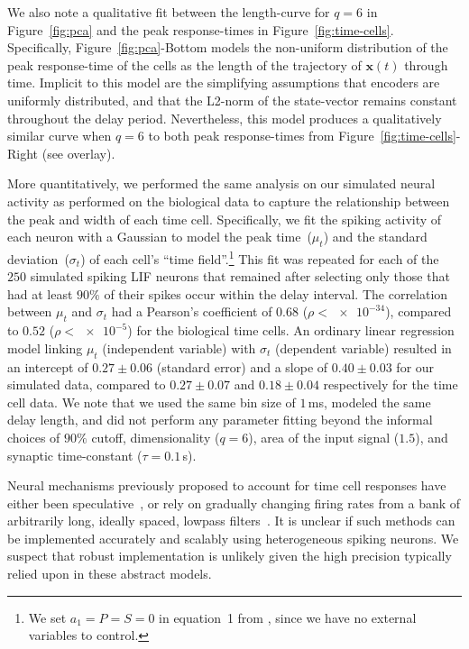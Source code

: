 \documentclass[12pt]{article}
\theoremstyle{definition}
\renewcommand{\vec}{\mathbf}  %
\begin{document}
We also note a qualitative fit between the length-curve for $q=6$ in Figure~\ref{fig:pca} and the peak response-times in Figure~\ref{fig:time-cells}.
Specifically, Figure~\ref{fig:pca}-Bottom models the non-uniform distribution of the peak response-time of the cells as the length of the trajectory of $\vec{x}(t)$ through time.
Implicit to this model are the simplifying assumptions that encoders are uniformly distributed, and that the L2-norm of the state-vector remains constant throughout the delay period.
Nevertheless, this model produces a qualitatively similar curve when $q = 6$ to both peak response-times from Figure~\ref{fig:time-cells}-Right (see overlay).

More quantitatively, we performed the same analysis on our simulated neural activity as \citet{tiganj2016sequential} performed on the biological data to capture the relationship between the peak and width of each time cell.
Specifically, we fit the spiking activity of each neuron with a Gaussian to model the peak time~($\mu_t$) and the standard deviation~($\sigma_t$) of each cell's ``time field''.\footnote{
We set $a_1 = P = S = 0$ in equation~1 from \citet{tiganj2016sequential}, since we have no external variables to control.
}
This fit was repeated for each of the $250$ simulated spiking LIF neurons that remained after selecting only those that had at least $90\%$ of their spikes occur within the delay interval.
The correlation between $\mu_t$ and $\sigma_t$ had a Pearson's coefficient of $0.68$ ($\rho < \num{e-34}$), compared to $0.52$ ($\rho < \num{e-5}$) for the biological time cells.
An ordinary linear regression model linking $\mu_t$ (independent variable) with $\sigma_t$ (dependent variable) resulted in an intercept of $0.27 \pm 0.06$ (standard error) and a slope of $0.40 \pm 0.03$ for our simulated data, compared to $0.27 \pm 0.07$ and $0.18 \pm 0.04$ respectively for the time cell data.
We note that we used the same bin size of $1$\,ms, modeled the same delay length, and did not perform any parameter fitting beyond the informal choices of $90\%$ cutoff, dimensionality ($q=6$), area of the input signal ($1.5$), and synaptic time-constant ($\tau = 0.1$\,s).

Neural mechanisms previously proposed to account for time cell responses have either been speculative~\citep{tiganj2016sequential},
or rely on gradually changing firing rates from a bank of arbitrarily long, ideally spaced, lowpass filters~\citep{shankar2012scale, howard2014unified, tiganj2015simple, tiganj2017neural}.
It is unclear if such methods can be implemented accurately and scalably using heterogeneous spiking neurons.
We suspect that robust implementation is unlikely given the high precision typically relied upon in these abstract models.
\end{document}
